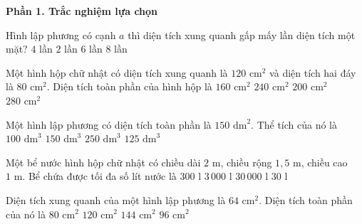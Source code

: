 \textbf{Phần 1. Trắc nghiệm lựa chọn}

\begin{ex} %
Hình lập phương có cạnh $a$ thì diện tích xung quanh gấp mấy lần diện tích một mặt?
\choice
{\True $4$ lần}
{$2$ lần}
{$6$ lần}
{$8$ lần}
\end{ex}

\begin{ex} %
Một hình hộp chữ nhật có diện tích xung quanh là $120\text{ cm}^2$ và diện tích hai đáy là $80\text{ cm}^2$. Diện tích toàn phần của hình hộp là
\choice
{$160\text{ cm}^2$}
{$240\text{ cm}^2$}
{\True $200\text{ cm}^2$}
{$280\text{ cm}^2$}
\end{ex}

\begin{ex} %
Một hình lập phương có diện tích toàn phần là $150\text{ dm}^2$. Thể tích của nó là
\choice
{$100\text{ dm}^3$}
{$150\text{ dm}^3$}
{$250\text{ dm}^3$}
{\True $125\text{ dm}^3$}
\end{ex}

\begin{ex} %
Một bể nước hình hộp chữ nhật có chiều dài $2\text{ m}$, chiều rộng $1{,}5\text{ m}$, chiều cao $1\text{ m}$. Bể chứa được tối đa số lít nước là
\choice
{$300\text{ l}$}
{\True $3\,000\text{ l}$}
{$30\,000\text{ l}$}
{$30\text{ l}$}
\end{ex}

\begin{ex} %
Diện tích xung quanh của một hình lập phương là $64\text{ cm}^2$. Diện tích toàn phần của nó là
\choice
{$80\text{ cm}^2$}
{$120\text{ cm}^2$}
{$144\text{ cm}^2$}
{\True $96\text{ cm}^2$}
\end{ex}

